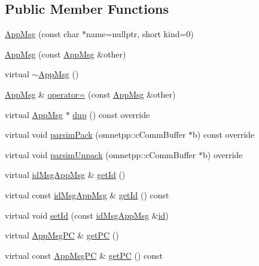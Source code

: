 \subsection*{Public Member Functions}
\begin{DoxyCompactItemize}
\item 
\hyperlink{class_app_msg_abcde1b0a82cb815e59b04ba891f8d1a0}{App\+Msg} (const char $\ast$name=nullptr, short kind=0)
\item 
\hyperlink{class_app_msg_a1b1df77f37c0aba71d69dd65b963c5d5}{App\+Msg} (const \hyperlink{class_app_msg}{App\+Msg} \&other)
\item 
virtual \hyperlink{class_app_msg_ac15790acabb2755dd83d1d29f57e498c}{$\sim$\+App\+Msg} ()
\item 
\hyperlink{class_app_msg}{App\+Msg} \& \hyperlink{class_app_msg_abb8f6f1fa21e6597ff28f6df72b435ad}{operator=} (const \hyperlink{class_app_msg}{App\+Msg} \&other)
\item 
virtual \hyperlink{class_app_msg}{App\+Msg} $\ast$ \hyperlink{class_app_msg_ab4d1256f22c1ee48aec128e558a03940}{dup} () const override
\item 
virtual void \hyperlink{class_app_msg_a97036583c6a13015d1be1ac6cf87505e}{parsim\+Pack} (omnetpp\+::c\+Comm\+Buffer $\ast$b) const override
\item 
virtual void \hyperlink{class_app_msg_a6852bb25218542149dcfb9f8ba672b7f}{parsim\+Unpack} (omnetpp\+::c\+Comm\+Buffer $\ast$b) override
\item 
virtual \hyperlink{_app_msg__m_8h_a0bd5e3a5ba85ac1fa0fd0fae34d903c1}{id\+Msg\+App\+Msg} \& \hyperlink{class_app_msg_abd9e4fa4ce0b074123b4e0cf64f5d743}{get\+Id} ()
\item 
virtual const \hyperlink{_app_msg__m_8h_a0bd5e3a5ba85ac1fa0fd0fae34d903c1}{id\+Msg\+App\+Msg} \& \hyperlink{class_app_msg_a0a87f5d332044dcd5ce861f6bcfaf6b2}{get\+Id} () const
\item 
virtual void \hyperlink{class_app_msg_ac76f921f7a873b5ca4b944fbbacfdf1c}{set\+Id} (const \hyperlink{_app_msg__m_8h_a0bd5e3a5ba85ac1fa0fd0fae34d903c1}{id\+Msg\+App\+Msg} \&\hyperlink{class_app_msg_aadaa93732c4df84c8b2ef13d7199f9a1}{id})
\item 
virtual \hyperlink{_app_msg__m_8h_abcd76636e4b750d033ffc348601dd7a2}{App\+Msg\+PC} \& \hyperlink{class_app_msg_a50acdb9331a812120c945612e81cd04f}{get\+PC} ()
\item 
virtual const \hyperlink{_app_msg__m_8h_abcd76636e4b750d033ffc348601dd7a2}{App\+Msg\+PC} \& \hyperlink{class_app_msg_a19864419107e294ac7c64553ceb5a9f0}{get\+PC} () const

\end{DoxyCompactItemize}
